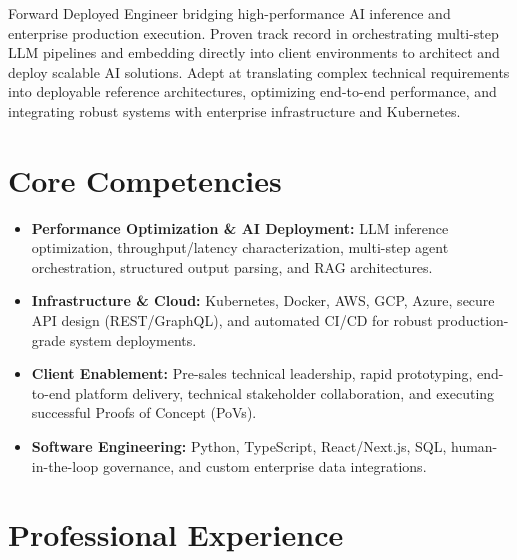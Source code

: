 \documentclass[11pt,a4paper,sans]{moderncv}
\begin{document}
\makecvtitle

Forward Deployed Engineer bridging high-performance AI inference and enterprise production execution. Proven track record in orchestrating multi-step LLM pipelines and embedding directly into client environments to architect and deploy scalable AI solutions. Adept at translating complex technical requirements into deployable reference architectures, optimizing end-to-end performance, and integrating robust systems with enterprise infrastructure and Kubernetes.

\section{Core Competencies}
\begin{itemize}
\item \textbf{Performance Optimization \& AI Deployment:} LLM inference optimization, throughput/latency characterization, multi-step agent orchestration, structured output parsing, and RAG architectures.
\item \textbf{Infrastructure \& Cloud:} Kubernetes, Docker, AWS, GCP, Azure, secure API design (REST/GraphQL), and automated CI/CD for robust production-grade system deployments.
\item \textbf{Client Enablement:} Pre-sales technical leadership, rapid prototyping, end-to-end platform delivery, technical stakeholder collaboration, and executing successful Proofs of Concept (PoVs).
\item \textbf{Software Engineering:} Python, TypeScript, React/Next.js, SQL, human-in-the-loop governance, and custom enterprise data integrations.
\end{itemize}

\section{Professional Experience}
\end{document}
